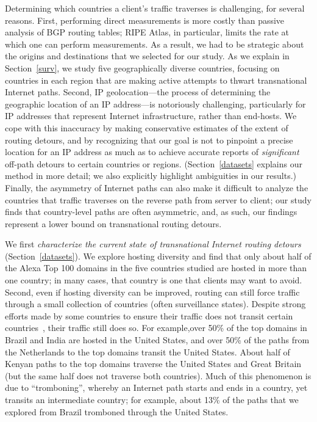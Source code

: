 Determining which countries a client's traffic traverses is challenging, for
several reasons.  First, performing direct measurements is more costly
than passive analysis of BGP routing tables; RIPE Atlas, in particular,
limits the rate at which one can perform measurements.  As a result, we
had to be strategic about the origins and destinations that we selected
for our study. As we explain in Section~\ref{surv}, we study five
geographically diverse countries, 
focusing on countries in each region that are
making active attempts to thwart transnational Internet paths.  Second,
IP geolocation---the process of determining the geographic location of an
IP address---is notoriously challenging, particularly for IP addresses
that represent Internet infrastructure, rather than end-hosts. We cope
with this inaccuracy by making conservative estimates of the extent of
routing detours, and by recognizing that our goal is not to pinpoint a
precise location for an IP address as much as to achieve accurate
reports of {\em significant} off-path detours to certain countries or
regions. (Section~\ref{datasets} explains our method in more detail; we
also explicitly highlight ambiguities in our results.) Finally, the
asymmetry of Internet paths can also make it difficult to analyze the
countries that traffic traverses on the reverse path from server to
client; our study finds that country-level paths are often asymmetric,
and, as such, our findings represent a lower bound on transnational
routing detours.

We first {\em characterize the current state of transnational Internet
routing detours} (Section~\ref{datasets}).  We explore hosting diversity
and find that only about half of the Alexa Top 100 domains in the five
countries studied are hosted in more than one country; in many cases,
that country is one that clients may want to avoid. Second, even if
hosting diversity can be improved, routing can still force traffic
through a small collection of countries (often surveillance
states). Despite strong efforts made by some countries to ensure their
traffic does not transit certain countries~\cite{brazil_history,
  brazil_break_from_US, brazil_conference, brazil_conference2,
  brazil_human_rights}, their traffic still does so.  For example,over 50\% of the
top domains in Brazil and India are hosted in the United States, and
over 50\% of the paths from the Netherlands to the top domains transit
the United States.  About half of Kenyan paths to the top domains
traverse the United States and Great Britain (but the same half does not
traverse both countries).  Much of this phenomenon is due to
``tromboning'', whereby an Internet path starts and ends in a country,
yet transits an intermediate country; for example, about 13\% of the
paths that we explored from Brazil tromboned through the United States.


